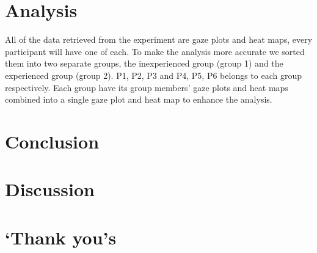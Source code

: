 \documentclass{article}
\begin{document}
\section{Analysis}
All of the data retrieved from the experiment are gaze plots and heat maps, every participant will have one of each. To make the analysis more accurate we sorted them into two separate groups, the inexperienced group (group 1) and the experienced group (group 2). P1, P2, P3 and P4, P5, P6 belongs to each group respectively. Each group have its group members’ gaze plots and heat maps combined into a single gaze plot and heat map to enhance the analysis.

\section{Conclusion}

\section{Discussion}

\section{`Thank you's}
\end{document}
